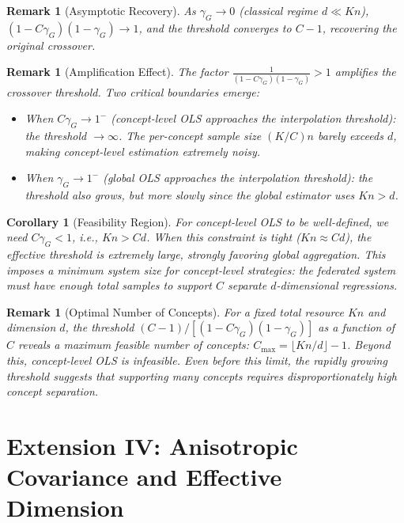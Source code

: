 \documentclass[11pt,a4paper]{article}
\newtheorem{corollary}[theorem]{Corollary}
\newtheorem{remark}[theorem]{Remark}
\begin{document}
\begin{remark}[Asymptotic Recovery]
As $\gamma_G \to 0$ (classical regime $d \ll Kn$), $(1-C\gamma_G)(1-\gamma_G) \to 1$, and the threshold converges to $C - 1$, recovering the original crossover.
\end{remark}

\begin{remark}[Amplification Effect]
The factor $\frac{1}{(1 - C\gamma_G)(1 - \gamma_G)} > 1$ \emph{amplifies} the crossover threshold. Two critical boundaries emerge:
\begin{itemize}
\item When $C\gamma_G \to 1^-$ (concept-level OLS approaches the interpolation threshold): the threshold $\to \infty$. The per-concept sample size $(K/C)n$ barely exceeds $d$, making concept-level estimation extremely noisy.
\item When $\gamma_G \to 1^-$ (global OLS approaches the interpolation threshold): the threshold also grows, but more slowly since the global estimator uses $Kn > d$.
\end{itemize}
\end{remark}

\begin{corollary}[Feasibility Region]\label{cor:feasibility}
For concept-level OLS to be well-defined, we need $C\gamma_G < 1$, i.e., $Kn > Cd$. When this constraint is tight ($Kn \approx Cd$), the effective threshold is extremely large, strongly favoring global aggregation. This imposes a \emph{minimum system size} for concept-level strategies: the federated system must have enough total samples to support $C$ separate $d$-dimensional regressions.
\end{corollary}

\begin{remark}[Optimal Number of Concepts]
For a fixed total resource $Kn$ and dimension $d$, the threshold $(C-1)/[(1-C\gamma_G)(1-\gamma_G)]$ as a function of $C$ reveals a \emph{maximum feasible number of concepts}: $C_{\max} = \lfloor Kn/d \rfloor - 1$. Beyond this, concept-level OLS is infeasible. Even before this limit, the rapidly growing threshold suggests that supporting many concepts requires disproportionately high concept separation.
\end{remark}


\section{Extension IV: Anisotropic Covariance and Effective Dimension}
\end{document}
